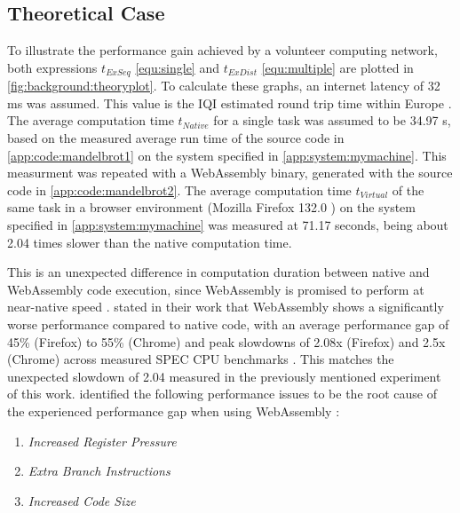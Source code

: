 \subsection{Theoretical Case}
\label{subsec:background:theroy_example}
To illustrate the performance gain achieved by a volunteer computing network, both expressions $t_{ExSeq}$ \eqref{equ:single} and $t_{ExDist}$ \eqref{equ:multiple} are plotted in \autoref{fig:background:theoryplot}. To calculate these graphs, an internet latency of 32 ms \cite{backend:latency} was assumed. This value is the \ac{IQI} estimated round trip time within Europe \cite{backend:latency}. The average computation time $t_{Native}$ for a single task was assumed to be 34.97 s, based on the measured average run time of the source code in \autoref{app:code:mandelbrot1} on the system specified in \autoref{app:system:mymachine}. This measurment was repeated with a WebAssembly binary, generated with the source code in \autoref{app:code:mandelbrot2}. The average computation time $t_{Virtual}$ of the same task in a browser environment (Mozilla Firefox 132.0 \cite{background:firefox}) on the system specified in \autoref{app:system:mymachine} was measured at 71.17 seconds, being about 2.04 times slower than the native computation time.
\newline
\begin{addmargin}[25pt]{25pt}
  This is an unexpected difference in computation duration between native and WebAssembly code execution, since WebAssembly is promised to perform at near-native speed \cite{methodology:wasm, methodology:wasmW3C}. \citeauthor{background:not-so-fast} stated in their work that WebAssembly shows a significantly worse performance compared to native code, with an average performance gap of 45\% (Firefox) to 55\% (Chrome) and peak slowdowns of 2.08x (Firefox) and 2.5x (Chrome) across measured SPEC \acs{CPU} benchmarks \cite{background:not-so-fast}. This matches the unexpected slowdown of 2.04 measured in the previously mentioned experiment of this work. \citeauthor{background:not-so-fast} identified the following performance issues to be the root cause of the experienced performance gap when using WebAssembly \cite{background:not-so-fast}:
  \begin{enumerate}
    \item \emph{Increased Register Pressure}
    \item \emph{Extra Branch Instructions}
    \item \emph{Increased Code Size}
  \end{enumerate}
\end{addmargin}
